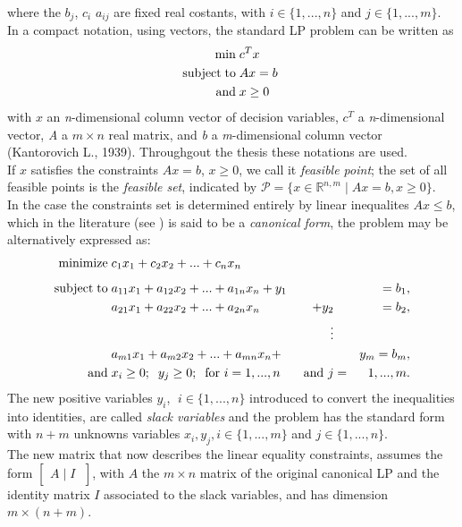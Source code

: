 \documentclass[a4paper,10 pt,titlepage,twoside]{book}
\theoremstyle{plain}
\theoremstyle{definition}
\theoremstyle{remark}
\begin{document}
where the $b_{j}$, $c_{i}$  $a_{ij}$ are fixed real costants, with $i \in\{1,...,n\}$ and $j\in\{1,...,m\}$.\\ In a compact notation, using vectors, the standard LP problem can be written as
\begin{equation}\label{(Prim)}
 \begin{split}
\min\;&c^{T}x\\
\text{subject\;to\;}&Ax= b\;\\\text{and\;}&x\geq0
 \end{split}
\end{equation}
with $x$ an \textit{n}-dimensional column vector of decision variables, $c^
{T}$ a \textit{n}-dimensional vector, \textit{A} a $m \times n$ real matrix, and \textit{b} a \textit{m}-dimensional column vector (Kantorovich L., 1939).
Throughgout the thesis these notations are used.\\
If $x$ satisfies the constraints $Ax = b$, $x\geq0$, we call it \textit{feasible point}; the set of all feasible points is the \textit{feasible set}, indicated by $\mathcal{P}=\lbrace x\in\mathbb{R}^{n,m}\; |\; Ax = b , x \geq0\rbrace$.\\
In the case the constraints set is determined entirely by linear inequalites $Ax \leq b$, which in the literature (see \cite{W}) is said to be a \textit{canonical form}, the problem may be alternatively expressed as:
\begin{alignat*}{3}
\text{minimize\;}&c_1 x_1 + c_2 x_2+ ...+c_n x_n&&&\\[1.8mm]
\text{subject\;to\;}&a_{11} x_1 +a_{12}x_2 + ... +a_{1n}x_n +y_{1}&&&= b_1,\\
		   	&a_{21}x_1+a_{22}x_2+ ... +a_{2n}x_n&+y_{2}&&= b_2,\\
&&\;\;\;\vdots&&\\
&a_{m1}x_1+a_{m2}x_2+ ... +a_{mn}x_n+&&&y_{m}=b_m,\\
\text{and} \;& x_{i} \geq 0;\;\; y_{j} \geq 0; \text{\;\;for }i = 1,...,n&\text{ and }j&=&1,...,m.
\end{alignat*}
The new positive variables $\mathit{y_{i}}$, $\;i \in \{1, ..., n\}$ introduced to convert the inequalities into identities, are called \textit{slack variables} and the problem has the standard form with $n+m$ unknowns variables $x_{i}, y_{j},i \in \{1, ..., m\}$ and $j \in \{1, ..., n\}.$\\ The new matrix that now describes the linear equality constraints, assumes the form $\left[\begin{matrix}A\;\vert\; I\;\end{matrix}\right]$, with $A$ the $m \times n$ matrix of the original canonical LP and the identity matrix $I$ associated to the slack variables, and has dimension $m \times (n + m)$.\\
\end{document}
